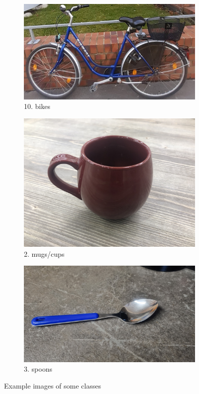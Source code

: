 \documentclass{tubaf-article}
\begin{document}
	\begin{figure}[h!]
		\centering
		\begin{subfigure}[b]{0.3\textwidth}
			\centering
			\includegraphics[width=\textwidth]{ex1.jpeg}
			\caption{10. bikes}
			\label{fig:bild1}
		\end{subfigure}
		\hfill
		\begin{subfigure}[b]{0.3\textwidth}
			\centering
			\includegraphics[width=\textwidth]{ex3.jpeg}
			\caption{2. mugs/cups}
			\label{fig:bild2}
		\end{subfigure}
		\hfill
		\begin{subfigure}[b]{0.3\textwidth}
			\centering
			\includegraphics[width=\textwidth]{ex2.jpeg}
			\caption{3. spoons}
			\label{fig:bild2}
		\end{subfigure}
		\hfill
		\caption{Example images of some classes}
		\label{fig:nebeneinander}
	\end{figure}
\end{document}
